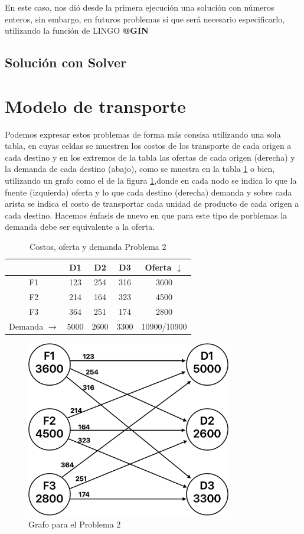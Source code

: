 \documentclass[12pt]{article}  %
\begin{document}
En este caso, nos dió desde la primera ejecución una solución con números enteros, sin embargo, en futuros problemas sí que será necesario especificarlo, utilizando la función de LINGO \textbf{@GIN}

\subsection{Solución con Solver}

\section{Modelo de transporte}
Podemos expresar estos problemas de forma más consisa utilizando una sola tabla, en cuyas celdas se muestren los costos de los transporte de cada origen a cada destino y en los extremos de la tabla las ofertas de cada origen (derecha) y la demanda de cada destino (abajo), como se muestra en la tabla \ref{tab:prob2} o bien, utilizando un grafo como el de la figura \ref{fig:grafProb2},donde en cada nodo se indica lo que la fuente (izquierda) oferta y lo que cada destino (derecha) demanda y sobre cada arista se indica el costo de transportar cada unidad de producto de cada origen a cada destino. Hacemos énfasis de nuevo en que para este tipo de porblemas la demanda debe ser equivalente a la oferta.

\begin{table}[H]
\centering
\caption{Costos, oferta y demanda Problema 2}
\label{tab:prob2}
\begin{tabular}{c|ccc|c}
& D1 & D2 & D3 & Oferta $\downarrow$ \\
\hline
F1 & 123 & 254 & 316 & 3600 \\
F2 & 214 & 164 & 323 & 4500 \\
F3 & 364 & 251 & 174 & 2800 \\
\hline
Demanda $\rightarrow$ & 5000 & 2600 & 3300 & 10900/10900
\end{tabular}
\end{table}

\begin{figure}[h]
    \centering
    \caption{Grafo para el Problema 2}
    \label{fig:grafProb2}
    \includegraphics[width=0.8\textwidth]{grafoProb2.png}
\end{figure}
\end{document}
